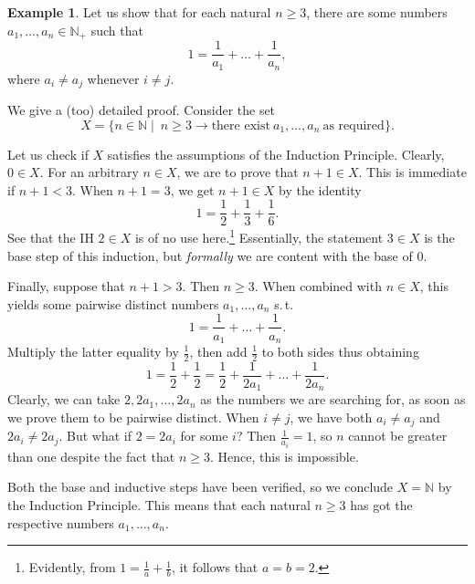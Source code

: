 \documentclass[12pt,notitlepage]{article}
\theoremstyle{plain}
\theoremstyle{definition}
\newtheorem{exm}[thm]{Example}
\theoremstyle{plain}
\newcommand{\N}{\mathbb{N}}
\newcommand{\1}{\mathbf{1}}
\newcommand{\0}{\mathbf{0}}
\newcommand{\mcomm}[1]{}
\begin{document}
\begin{exm}
Let us show that for each natural $n \geq 3$, there are some numbers $a_1,\ldots,a_n \in \N_+$ such that
$$1 = \frac{1}{a_1} + \ldots + \frac{1}{a_n},$$
where $a_i \neq a_j$ whenever $i \neq j$.

We give a (too) detailed proof. Consider the set
$$X = \{ n \in \N \mid\  n \geq 3 \to \mbox{there exist}\ a_1,\ldots, a_n\ \mbox{as required}\}.$$
\mcomm{The Instructor might prefer a `predicate version' of this inductive proof instead.
\medskip\\
Many students justly see that the base case here is that of $n = 3$ essentially. Then they try to change \emph{the inductive principle} accordingly rather than the set or predicate in question. In my view, this practice is caused by their aversion to anything else than a simple equation in the inductive statement (like, say, an implication). This is counterproductive and the students should be discouraged from doing so at least in these easy early stage examples. They should be rather taught to adapt to the \emph{principle as it is} and to flexibly change the statement they want. Of course, these requirements may be finally lifted for harder problems and for students able to solve them.}
Let us check if $X$ satisfies the assumptions of the Induction Principle. Clearly, $0 \in X$. For an arbitrary $n \in X$, we are to prove that $n + 1 \in X$. This is immediate if $n + 1 < 3$. When $n + 1 = 3$, we get $n+1 \in X$ by the identity
$$1 = \frac{1}{2} + \frac{1}{3} + \frac{1}{6}.$$
See that the IH $2 \in X$ is of no use here.\footnote{Evidently, from $1 = \frac{1}{a} + \frac{1}{b}$, it follows that $a = b = 2$.} Essentially, the statement $3 \in X$ is the base step of this induction, but \emph{formally} we are content with the base of $0$.

Finally, suppose that $n + 1 > 3$. Then $n \geq 3$. When combined with $n \in X$, this yields some pairwise distinct numbers $a_1,\ldots, a_n$ s.\,t.\ 
$$1 = \frac{1}{a_1} + \ldots + \frac{1}{a_n}.$$
Multiply the latter equality by $\frac{1}{2}$, then add $\frac{1}{2}$ to both sides thus obtaining
$$1 = \frac{1}{2} + \frac{1}{2} = \frac{1}{2} + \frac{1}{2a_1} + \ldots + \frac{1}{2a_n}.$$
Clearly, we can take $2, 2a_1, \ldots, 2a_n$ as the numbers we are searching for, as soon as we prove them to be pairwise distinct. When $i \neq j$, we have both $a_i \neq a_j$ and $2a_i \neq 2a_j$. But what if $2 = 2 a_i$ for some $i$? Then $\frac{1}{a_i} = 1$, so $n$ cannot be greater than one despite the fact that $n \geq 3$. Hence, this is impossible.

Both the base and inductive steps have been verified, so we conclude $X = \N$ by the Induction Principle. This means that each natural $n \geq 3$ has got the respective numbers $a_1,\ldots, a_n$.
\end{exm}
\end{document}
